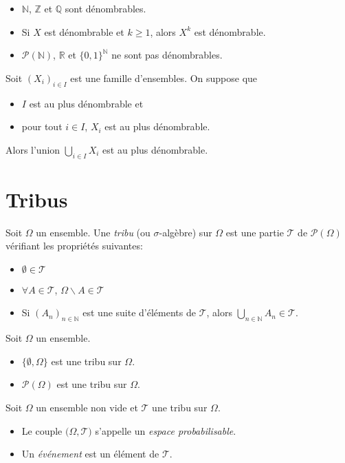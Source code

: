 \documentclass{yann}
\renewcommand{\T}{\mathscr{T}}
\newcommand{\Part}{\mathcal{P}}
\newcommand{\Pro}{\bigl(Ω,\T\bigr)}
\begin{document}
\begin{itemize}
\item
  $ℕ$, $ℤ$ et $ℚ$ sont dénombrables.
\item
  Si $X$ est dénombrable et $k≥1$, alors $X^k$ est dénombrable.
\item
  $\mathcal{P}(ℕ)$, $ℝ$ et $\{0,1\}^ℕ$ ne sont pas dénombrables.
\end{itemize}


Soit $(X_i)_{i∈I}$ est une famille d'ensembles. On suppose que
\begin{itemize}
\item
  $I$ est au plus dénombrable et
\item
  pour tout $i∈I$, $X_i$ est au plus dénombrable.
\end{itemize}

Alors l'union $⋃_{i∈I} X_i$ est au plus dénombrable.

\section{Tribus}


Soit $Ω$ un ensemble.
Une \emph{tribu} (ou $σ$-algèbre) sur $Ω$ est une partie $\T$ de $\Part(Ω)$ vérifiant les propriétés suivantes:
\begin{itemize}
\item
  $∅∈\T$
\item
  $∀A ∈\T$, $Ω∖A ∈\T$
\item
  Si $(A_n)_{n∈ℕ}$ est une suite d'éléments de $\T$, alors $⋃_{n∈ℕ} A_n∈\T$.
\end{itemize}


Soit $Ω$ un ensemble.
\begin{itemize}
\item
  $\{ ∅, Ω\}$ est une tribu sur $Ω$.
\item
  $\Part(Ω)$ est une tribu sur $Ω$.
\end{itemize}


Soit $Ω$ un ensemble non vide et $\T$ une tribu sur $Ω$.
\begin{itemize}
\item
  Le couple $\Pro$ s'appelle un \emph{espace probabilisable}.
\item
  Un \emph{événement} est un élément de $\T$.
\end{itemize}
\end{document}
